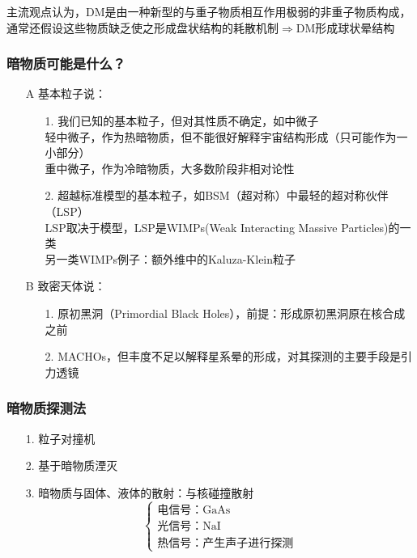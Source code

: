 \par 
主流观点认为，DM是由一种新型的与重子物质相互作用极弱的非重子物质构成，通常还假设这些物质缺乏使之形成盘状结构的耗散机制$\Rightarrow$DM形成球状晕结构 \\

\subsubsection{暗物质可能是什么？}
\begin{itemize}
	\item[A] 基本粒子说：
	\begin{itemize}
		\item[1. ] 我们已知的基本粒子，但对其性质不确定，如中微子 \\
		轻中微子，作为热暗物质，但不能很好解释宇宙结构形成（只可能作为一小部分） \\
		重中微子，作为冷暗物质，大多数阶段非相对论性
		\item[2. ] 超越标准模型的基本粒子，如BSM（超对称）中最轻的超对称伙伴（LSP） \\
		LSP取决于模型，LSP是WIMPs(Weak Interacting Massive Particles)的一类 \\
		另一类WIMPs例子：额外维中的Kaluza-Klein粒子
	\end{itemize}

	\item[B] 致密天体说：
	\begin{itemize}
		\item[1. ] 原初黑洞（Primordial Black Holes），前提：形成原初黑洞原在核合成之前
		\item[2. ] MACHOs，但丰度不足以解释星系晕的形成，对其探测的主要手段是引力透镜
	\end{itemize}
\end{itemize}
\subsubsection{暗物质探测法}
\begin{itemize}
	\item[1. ] 粒子对撞机
	\item[2. ] 基于暗物质湮灭
	\item[3. ] 暗物质与固体、液体的散射：与核碰撞散射 
	$$\begin{cases}
		\text{电信号：GaAs} \\
		\text{光信号：NaI} \\
		\text{热信号：产生声子进行探测}
	\end{cases}$$
\end{itemize}